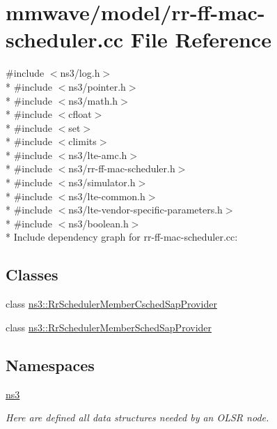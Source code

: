 \hypertarget{mmwave_2model_2rr-ff-mac-scheduler_8cc}{}\section{mmwave/model/rr-\/ff-\/mac-\/scheduler.cc File Reference}
\label{mmwave_2model_2rr-ff-mac-scheduler_8cc}
{\ttfamily \#include $<$ns3/log.\+h$>$}\\*
{\ttfamily \#include $<$ns3/pointer.\+h$>$}\\*
{\ttfamily \#include $<$ns3/math.\+h$>$}\\*
{\ttfamily \#include $<$cfloat$>$}\\*
{\ttfamily \#include $<$set$>$}\\*
{\ttfamily \#include $<$climits$>$}\\*
{\ttfamily \#include $<$ns3/lte-\/amc.\+h$>$}\\*
{\ttfamily \#include $<$ns3/rr-\/ff-\/mac-\/scheduler.\+h$>$}\\*
{\ttfamily \#include $<$ns3/simulator.\+h$>$}\\*
{\ttfamily \#include $<$ns3/lte-\/common.\+h$>$}\\*
{\ttfamily \#include $<$ns3/lte-\/vendor-\/specific-\/parameters.\+h$>$}\\*
{\ttfamily \#include $<$ns3/boolean.\+h$>$}\\*
Include dependency graph for rr-\/ff-\/mac-\/scheduler.cc\+:
\subsection*{Classes}
\begin{DoxyCompactItemize}
\item 
class \hyperlink{classns3_1_1RrSchedulerMemberCschedSapProvider}{ns3\+::\+Rr\+Scheduler\+Member\+Csched\+Sap\+Provider}
\item 
class \hyperlink{classns3_1_1RrSchedulerMemberSchedSapProvider}{ns3\+::\+Rr\+Scheduler\+Member\+Sched\+Sap\+Provider}
\end{DoxyCompactItemize}
\subsection*{Namespaces}
\begin{DoxyCompactItemize}
\item 
 \hyperlink{namespacens3}{ns3}
\begin{DoxyCompactList}\small\item\em Here are defined all data structures needed by an O\+L\+SR node. \end{DoxyCompactList}\end{DoxyCompactItemize}
